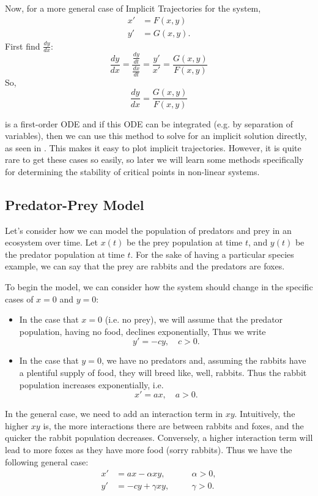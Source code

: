 Now, for a more general case of Implicit Trajectories for the system,
\begin{align*}
	x' &= F(x,y) \\
	y' &= G(x,y).
\end{align*}
First find $\frac{dy}{dx}$:
\[
\frac{dy}{dx} = \frac{\frac{dy}{dt}}{\frac{dx}{dt}} = \frac{y'}{x'} = \frac{G(x,y)}{F(x,y)}
\]
So, 
\begin{equation}\label{eq3.11}
	\frac{dy}{dx} = \frac{G(x,y)}{F(x,y)}
\end{equation}

 is a first-order ODE and if this ODE can be integrated (e.g. by separation of variables), then we can use this method to solve for an implicit solution directly, as seen in . This makes it easy to plot implicit trajectories. However, it is quite rare to get these cases so easily, so later we will learn some methods specifically for determining the stability of critical points in non-linear systems.

\subsection{Predator-Prey Model}\label{sec:lotkavolterra}

Let's consider how we can model the population of predators and prey in an ecosystem over time. Let $x(t)$ be the prey population at time $t$, and $y(t)$ be the predator population at time $t$. For the sake of having a particular species example, we can say that the prey are rabbits and the predators are foxes.

To begin the model, we can consider how the system should change in the specific cases of $x=0$ and $y=0$:
\begin{itemize}
	\item In the case that $x=0$ (i.e. no prey), we will assume that the predator population, having no food, declines exponentially, Thus we write
	\[
	y' = -cy, \quad c>0.
	\]
	\item In the case that $y=0$, we have no predators and, assuming the rabbits have a plentiful supply of food, they will breed like, well, rabbits. Thus the rabbit population increases exponentially, i.e.
	\[
	x' = ax, \quad a>0.
	\]
\end{itemize}

In the general case, we need to add an interaction term in $xy$. Intuitively, the higher $xy$ is, the more interactions there are between rabbits and foxes, and the quicker the rabbit population decreases. Conversely, a higher interaction term will lead to more foxes as they have more food (sorry rabbits). Thus we have the following general case:
\begin{equation}\label{eq:lotkavolterra}
	\begin{alignedat}{2}
		x' &= ax - \alpha xy, \quad &&\alpha>0, \\
		y' &= -cy + \gamma xy, \quad &&\gamma>0.
	\end{alignedat}
\end{equation}

